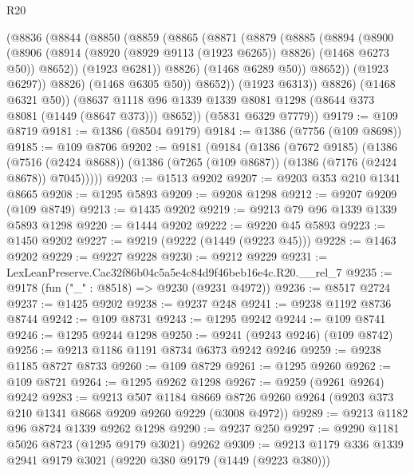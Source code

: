 \begin{lexlean}{R20}
\begin{coremodule}
                (@8836
                  (@8844
                    (@8850
                      (@8859
                        (@8865
                          (@8871
                            (@8879
                              (@8885
                                (@8894
                                  (@8900
                                    (@8906
                                      (@8914
                                        (@8920 (@8929 @9113 (@1923 @6265)) @8826)
                                        (@1468 @6273 @50))
                                      @8652))
                                  (@1923 @6281))
                                @8826)
                              (@1468 @6289 @50))
                            @8652))
                        (@1923 @6297))
                      @8826)
                    (@1468 @6305 @50))
                  @8652))
              (@1923 @6313))
            @8826)
          (@1468 @6321 @50))
        (@8637 @1118 @96 @1339 @1339 @8081 @1298 (@8644 @373 @8081 (@1449 (@8647 @373))) @8652))
      (@5831 @6329 @7779))
@9179 := @109 @8719
@9181 := @1386 (@8504 @9179)
@9184 := @1386 (@7756 (@109 @8698))
@9185 := @109 @8706
@9202 := @9181
    (@9184
      (@1386
        (@7672 @9185)
        (@1386
          (@7516 (@2424 @8688))
          (@1386 (@7265 (@109 @8687)) (@1386 (@7176 (@2424 @8678)) @7045)))))
@9203 := @1513 @9202
@9207 := @9203 @353 @210 @1341 @8665
@9208 := @1295 @5893
@9209 := @9208 @1298
@9212 := @9207 @9209 (@109 @8749)
@9213 := @1435 @9202
@9219 := @9213 @79 @96 @1339 @1339 @5893 @1298
@9220 := @1444 @9202
@9222 := @9220 @45 @5893
@9223 := @1450 @9202
@9227 := @9219 (@9222 (@1449 (@9223 @45)))
@9228 := @1463 @9202
@9229 := @9227 @9228
@9230 := @9212 @9229
@9231 := LexLeanPreserve.Cac32f86b04c5a5e4c84d9f46beb16e4c.R20.__rel_7
@9235 := @9178 (fun ("_" : @8518) => @9230 (@9231 @4972))
@9236 := @8517 @2724
@9237 := @1425 @9202
@9238 := @9237 @248
@9241 := @9238 @1192 @8736 @8744
@9242 := @109 @8731
@9243 := @1295 @9242
@9244 := @109 @8741
@9246 := @1295 @9244 @1298
@9250 := @9241 (@9243 @9246) (@109 @8742)
@9256 := @9213 @1186 @1191 @8734 @6373 @9242 @9246
@9259 := @9238 @1185 @8727 @8733
@9260 := @109 @8729
@9261 := @1295 @9260
@9262 := @109 @8721
@9264 := @1295 @9262 @1298
@9267 := @9259 (@9261 @9264) @9242
@9283 := @9213
    @507
    @1184
    @8669
    @8726
    @9260
    @9264
    (@9203 @373 @210 @1341 @8668 @9209 @9260 @9229 (@3008 @4972))
@9289 := @9213 @1182 @96 @8724 @1339 @9262 @1298
@9290 := @9237 @250
@9297 := @9290 @1181 @5026 @8723 (@1295 @9179 @3021) @9262
@9309 := @9213 @1179 @336 @1339 @2941 @9179 @3021 (@9220 @380 @9179 (@1449 (@9223 @380)))

\end{coremodule}
\end{lexlean}
